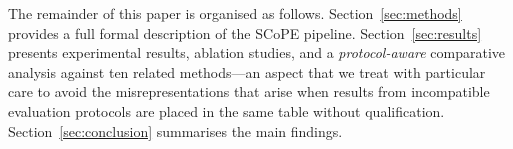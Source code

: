 The remainder of this paper is organised as follows.
Section~\ref{sec:methods} provides a full formal description of the
SCoPE pipeline. Section~\ref{sec:results} presents experimental
results, ablation studies, and a \emph{protocol-aware} comparative
analysis against ten related methods---an aspect that we treat
with particular care to avoid the misrepresentations that arise when
results from incompatible evaluation protocols are placed in the
same table without qualification. Section~\ref{sec:conclusion}
summarises the main findings.
